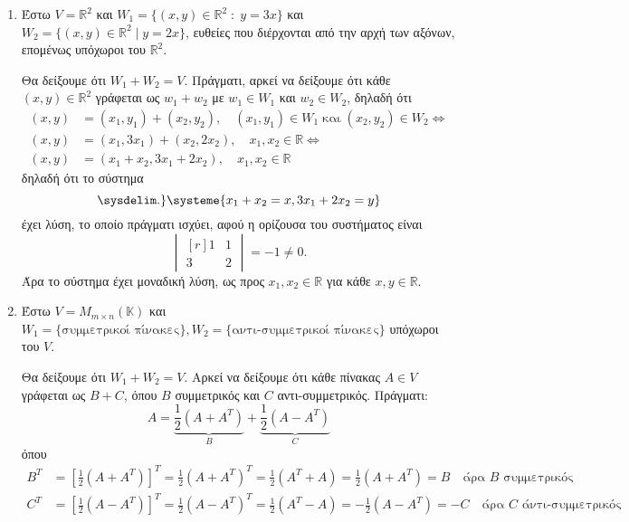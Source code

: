 \begin{examples}
\item {}
    \begin{enumerate}
        \item \label{ex:r2} Έστω $ V = \mathbb{R}^{2} $ και $ W_{1} = 
            \{(x,y)\in \mathbb{R}^{2} \; : \; y =3x \} $ και 
            $ W_{2} = \{(x,y)\in \mathbb{R}^{2} \mid y=2x \} $, ευθείες που διέρχονται 
            από την αρχή των αξόνων, επομένως υπόχωροι του $ \mathbb{R}^{2}$. 

            Θα δείξουμε ότι $ W_{1}+W_{2} = V $. Πράγματι, αρκεί να δείξουμε ότι 
            κάθε $ (x,y) \in \mathbb{R}^{2} $ γράφεται ως $ w_{1}+w_{2} $ με 
            $ w_{1} \in W_{1} $ και $ w_{2} \in W_{2} $, δηλαδή ότι 
            \begin{align*}
                (x,y) &= (x_{1}, y_{1}) + (x_{2}, y_{2}), \quad (x_{1}, y_{1}) 
                \in W_{1} \; \text{και} \; (x_{2}, y_{2}) \in W_{2}
                \Leftrightarrow \\
                (x,y) &= (x_{1}, 3x_{1}) + (x_{2}, 2x_{2}), \quad x_{1}, x_{2} 
                \in \mathbb{R} \Leftrightarrow \\
                (x,y) &= (x_{1}+ x_{2}, 3x_{1}+ 2x_{2}), \quad x_{1}, x_{2} 
                \in \mathbb{R} 
            \end{align*}
            δηλαδή ότι το σύστημα 
            \[
            \sysdelim.\}\systeme{x_{1} + x_{2}=x,3x_{1} + 2x_{2}= y} 
        \] 
        έχει λύση, το οποίο πράγματι ισχύει, αφού η ορίζουσα του συστήματος είναι 
        \[
            \begin{vmatrix*}[r]
                1 & 1 \\
                3 & 2
            \end{vmatrix*} = -1 \neq 0.
        \]
        Άρα το σύστημα έχει μοναδική λύση, ως προς $ x_{1}, x_{2} \in \mathbb{R} $ 
        για κάθε $ x, y \in \mathbb{R} $.

    \item\label{ex:sym} Έστω $ V = M_{m \times n}(\mathbb{K}) $ και $ W_{1} = 
        \{ \text{συμμετρικοί πίνακες} \}, W_{2} = 
        \{ \text{αντι-συμμετρικοί πίνακες} \} $ υπόχωροι του $V$.

        Θα δείξουμε ότι $ W_{1}+W_{2}=V $. Αρκεί να δείξουμε ότι κάθε πίνακας 
        $ A \in V $ γράφεται ως $ B+C $, όπου $ B $ συμμετρικός και $ C $ 
        αντι-συμμετρικός. Πράγματι:
        \[
            A = \underbrace{\frac{1}{2} (A+A^{T})}_{B} + 
            \underbrace{\frac{1}{2} (A-A^{T})}_{C} 
        \] 
        όπου
        \begin{align*}
            B^{T} &= \left[\frac{1}{2} (A+A^{T})\right]^{T} = 
            \frac{1}{2} (A+A^{T})^{T} = \frac{1}{2} (A^{T}+A) = 
            \frac{1}{2} (A+A^{T}) = B \quad \text{άρα $B$ συμμετρικός} \\
            C^{T} &= \left[\frac{1}{2} (A-A^{T})\right]^{T} = 
            \frac{1}{2} (A-A^{T})^{T} = \frac{1}{2} (A^{T}-A) = - 
            \frac{1}{2} (A-A^{T}) = -C \quad \text{άρα $C$ άντι-συμμετρικός}
        \end{align*}


\end{enumerate}
\end{examples}
